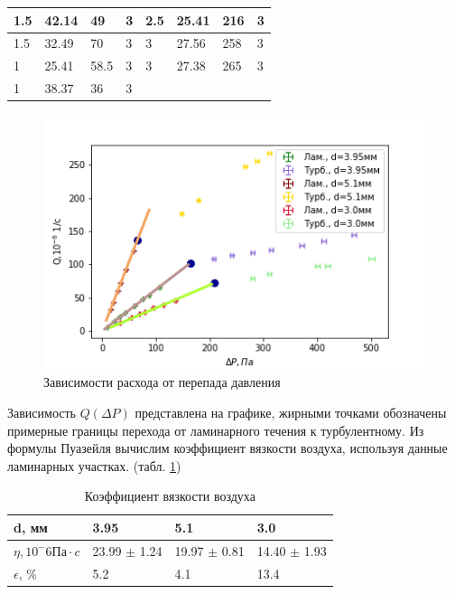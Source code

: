 \documentclass[a4paper,12pt]{article} %
\begin{document}
\begin{table}[h!]
\begin{tabular}{|llll|llll|}
\multicolumn{1}{|l|}{1.5} & \multicolumn{1}{l|}{42.14} & \multicolumn{1}{l|}{49}   & 3    & \multicolumn{1}{l|}{2.5} & \multicolumn{1}{l|}{25.41} & \multicolumn{1}{l|}{216} & 3    \\ \hline
\multicolumn{1}{|l|}{1.5} & \multicolumn{1}{l|}{32.49} & \multicolumn{1}{l|}{70}   & 3    & \multicolumn{1}{l|}{3}   & \multicolumn{1}{l|}{27.56} & \multicolumn{1}{l|}{258} & 3    \\ \hline
\multicolumn{1}{|l|}{1}   & \multicolumn{1}{l|}{25.41} & \multicolumn{1}{l|}{58.5} & 3    & \multicolumn{1}{l|}{3}   & \multicolumn{1}{l|}{27.38} & \multicolumn{1}{l|}{265} & 3    \\ \hline
\multicolumn{1}{|l|}{1}   & \multicolumn{1}{l|}{38.37} & \multicolumn{1}{l|}{36}   & 3    & \multicolumn{1}{l|}{}    & \multicolumn{1}{l|}{}      & \multicolumn{1}{l|}{}    &      \\ \hline
\end{tabular}
\end{table}
\begin{figure}[h!]
\begin{center}
\includegraphics[width=\textwidth]{Q(P)}
\end{center}
\caption{Зависимости расхода
от перепада давления} \label{Q(P)_pic}
\end{figure}

Зависимость $Q(\Delta P)$ представлена на графике, жирными точками обозначены примерные границы перехода от ламинарного течения к турбулентному. Из формулы Пуазейля вычислим коэффициент вязкости воздуха, используя данные ламинарных участках. (табл. \ref{Коэффицент})
\begin{table}[h!]
\caption{Коэффициент вязкости воздуха}
\label{Коэффицент}
\begin{tabular}{|l|l|l|l|}
\hline
d, мм                     & 3.95             & 5.1              & 3.0              \\ \hline
$\eta, 10^-6  Па \cdot c$ & 23.99 $\pm$ 1.24 & 19.97 $\pm$ 0.81 & 14.40 $\pm$ 1.93 \\ \hline
$\epsilon$, \%            & 5.2              & 4.1              & 13.4             \\ \hline
\end{tabular}
\end{table}
\end{document}

